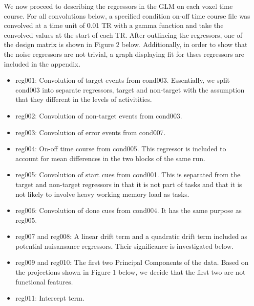 \documentclass[11pt]{article}
\begin{document}
We now proceed to describing the regressors in the GLM on each voxel time
course. For all convolutions below, a specified condition on-off time course 
file was convolved at a time unit of 0.01 TR with a gamma function and take the
convolved values at the start of each TR. After outlineing the regressors, one 
of the design matrix is shown in Figure 2 below. Additionally, in order to show
that the noise regressors are not trivial, a graph displaying fit for thses regressors 
are included in the appendix. 

\begin{itemize}
\item reg001: Convolution of target events from cond003. Essentially, we split cond003
into separate regressors, target and non-target with the assumption that they
different in the levels of activitities.

\item reg002: Convolution of non-target events from cond003.

\item reg003: Convolution of error events from cond007.

\item reg004: On-off time course from cond005. This regressor is included to account
for mean differences in the two blocks of the same run.

\item reg005: Convolution of start cues from cond001. This is separated from the
target and non-target regressors in that it is not part of tasks and that it is
not likely to involve heavy working memory load as tasks.

\item reg006: Convolution of done cues from cond004. It has the same purpose as
reg005.

\item reg007 and reg008: A linear drift term and a quadratic drift term included as
potential nuisansance regressors. Their significance is investigated below.

\item reg009 and reg010: The first two Principal Components of the data. Based on the
projections shown in Figure 1 below, we decide that the first two are not functional
features.

\item reg011: Intercept term.

\end{itemize}
\end{document}
